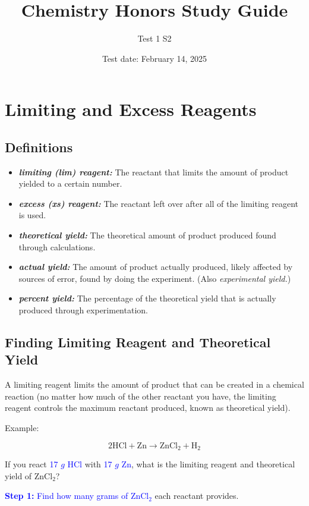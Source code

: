 \documentclass[a4paper, 12pt]{article}
\title{Chemistry Honors Study Guide}
\author{Test 1 S2}
\date{Test date: February 14, 2025}
\begin{document}
\maketitle

\section{Limiting and Excess Reagents}

\subsection*{Definitions}

\begin{itemize}[leftmargin=*, nosep]
    \item \textbf{\textit{limiting (lim) reagent:}} The reactant that limits the amount of product yielded to a certain number.
    \item \textbf{\textit{excess (xs) reagent:}} The reactant left over after all of the limiting reagent is used.
    \item \textbf{\textit{theoretical yield:}} The theoretical amount of product produced found through calculations.
    \item \textbf{\textit{actual yield:}} The amount of product actually produced, likely affected by sources of error, found by doing the experiment. (Also \textit{experimental yield.})
    \item \textbf{\textit{percent yield:}} The percentage of the theoretical yield that is actually produced through experimentation.
\end{itemize}

\subsection*{Finding Limiting Reagent and Theoretical Yield}
A limiting reagent limits the amount of product that can be created in a chemical reaction (no matter how much of the other reactant you have, the limiting reagent controls the maximum reactant produced, known as theoretical yield).

Example:

$$2\text{HCl} + \text{Zn} \longrightarrow \text{ZnCl}_2 + \text{H}_2$$

If you react \textcolor{blue}{17 $g$ HCl} with \textcolor{blue}{17 $g$ Zn}, what is the limiting reagent and theoretical yield of ZnCl$_2$?

\textcolor{blue}{\textbf{Step 1:} Find how many grams of ZnCl$_2$} each reactant provides.
\end{document}
